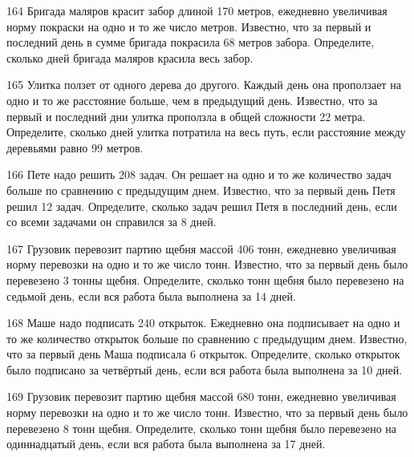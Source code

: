 \documentclass[4apaper]{article}
\begin{document}
\begin{taskBN}{164}
 Бригада маляров красит забор длиной 170 метров, ежедневно увеличивая норму покраски на одно и то же число метров. Известно, что за первый и последний день в сумме бригада покрасила 68 метров забора.  Определите, сколько дней бригада маляров красила весь забор. 
\end{taskBN}

\begin{taskBN}{165}
 Улитка ползет от одного дерева до другого. Каждый день она проползает на одно и то же расстояние больше, чем в предыдущий день. Известно, что за первый и последний дни улитка проползла в общей сложности 22 метра. Определите, сколько дней улитка потратила на весь путь, если расстояние между деревьями равно 99 метров.
\end{taskBN}

\begin{taskBN}{166}
Пете надо решить 208 задач. Он решает на одно и то же количество задач больше по сравнению с предыдущим днем. Известно, что за первый день Петя решил 12 задач. Определите, сколько задач решил Петя в последний день, если со всеми задачами он справился за 8 дней.
\end{taskBN}

\begin{taskBN}{167}
Грузовик перевозит партию щебня массой 406 тонн, ежедневно увеличивая норму перевозки на одно и то же число тонн. Известно, что за первый день было перевезено 3 тонны щебня. Определите, сколько тонн щебня было перевезено на седьмой день, если вся работа была выполнена за 14 дней.
\end{taskBN}

\begin{taskBN}{168}
Маше надо подписать 240 открыток. Ежедневно она подписывает на одно и то же количество открыток больше по сравнению с предыдущим днем. Известно, что за первый день Маша подписала 6 открыток. Определите, сколько открыток было подписано за четвёртый день, если вся работа была выполнена за 10 дней.
\end{taskBN}

\begin{taskBN}{169}
Грузовик перевозит партию щебня массой 680 тонн, ежедневно увеличивая норму перевозки на одно и то же число тонн. Известно, что за первый день было перевезено 8 тонн щебня. Определите, сколько тонн щебня было перевезено на одиннадцатый день, если вся работа была выполнена за 17 дней.
\end{taskBN}
\end{document}
